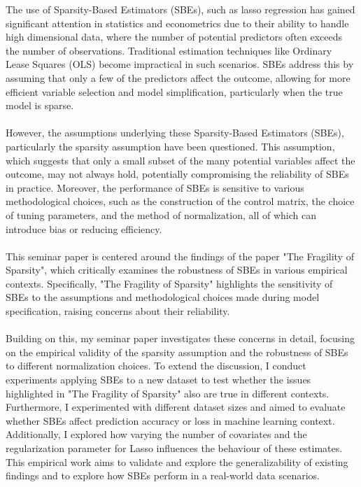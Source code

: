 The use of Sparsity-Based Estimators (SBEs), such as lasso regression has gained significant attention in statistics and econometrics due to their ability to handle high dimensional data, where the number of potential predictors often exceeds the number of observations. Traditional estimation techniques like Ordinary Lease Squares (OLS) become impractical in such scenarios. SBEs address this by assuming that only a few of the predictors affect the outcome, allowing for more efficient variable selection and model simplification, particularly when the true model is sparse.\\
\\
However, the assumptions underlying these Sparsity-Based Estimators (SBEs), particularly the sparsity assumption have been questioned. This assumption, which suggests that only a small subset of the many potential variables affect the outcome, may not always hold, potentially compromising the reliability of SBEs in practice. Moreover, the performance of SBEs is sensitive to various methodological choices, such as the construction of the control matrix, the choice of tuning parameters, and the method of normalization, all of which can introduce bias or reducing efficiency. \\
\\
This seminar paper is centered around the findings of the paper "The Fragility of Sparsity", which critically examines the robustness of SBEs in various empirical contexts. Specifically, "The Fragility of Sparsity" highlights the sensitivity of SBEs to the assumptions and methodological choices made during model specification, raising concerns about their reliability. \\
\\
Building on this, my seminar paper investigates these concerns in detail, focusing on the empirical validity of the sparsity assumption and the robustness of SBEs to different normalization choices. To extend the discussion, I conduct experiments applying SBEs to a new dataset to test whether the issues highlighted in "The Fragility of Sparsity" also are true in different contexts. Furthermore, I experimented with different dataset sizes and aimed to evaluate whether SBEs affect prediction accuracy or loss in machine learning context. Additionally, I explored how varying the number of covariates and the regularization parameter for Lasso influences the behaviour of these estimates. This empirical work aims to validate and explore the generalizability of existing findings and to explore how SBEs perform in a real-world data scenarios.

